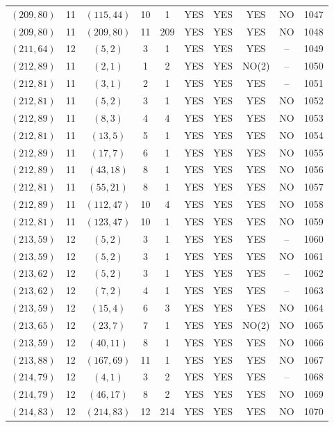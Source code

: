 \begin{longtable}{|c|c|c|c|c|c|c|c|c|c|}
$(209, 80)$ & 11 & $(115, 44)$ & 10 & 1 & YES & YES & YES & NO & 1047\\
$(209, 80)$ & 11 & $(209, 80)$ & 11 & 209 & YES & YES & YES & NO & 1048\\
$(211, 64)$ & 12 & $(5, 2)$ & 3 & 1 & YES & YES & YES & -- & 1049\\
$(212, 89)$ & 11 & $(2, 1)$ & 1 & 2 & YES & YES & NO(2) & -- & 1050\\
$(212, 81)$ & 11 & $(3, 1)$ & 2 & 1 & YES & YES & YES & -- & 1051\\
$(212, 81)$ & 11 & $(5, 2)$ & 3 & 1 & YES & YES & YES & NO & 1052\\
$(212, 89)$ & 11 & $(8, 3)$ & 4 & 4 & YES & YES & YES & NO & 1053\\
$(212, 81)$ & 11 & $(13, 5)$ & 5 & 1 & YES & YES & YES & NO & 1054\\
$(212, 89)$ & 11 & $(17, 7)$ & 6 & 1 & YES & YES & YES & NO & 1055\\
$(212, 89)$ & 11 & $(43, 18)$ & 8 & 1 & YES & YES & YES & NO & 1056\\
$(212, 81)$ & 11 & $(55, 21)$ & 8 & 1 & YES & YES & YES & NO & 1057\\
$(212, 89)$ & 11 & $(112, 47)$ & 10 & 4 & YES & YES & YES & NO & 1058\\
$(212, 81)$ & 11 & $(123, 47)$ & 10 & 1 & YES & YES & YES & NO & 1059\\
$(213, 59)$ & 12 & $(5, 2)$ & 3 & 1 & YES & YES & YES & -- & 1060\\
$(213, 59)$ & 12 & $(5, 2)$ & 3 & 1 & YES & YES & YES & NO & 1061\\
$(213, 62)$ & 12 & $(5, 2)$ & 3 & 1 & YES & YES & YES & -- & 1062\\
$(213, 62)$ & 12 & $(7, 2)$ & 4 & 1 & YES & YES & YES & -- & 1063\\
$(213, 59)$ & 12 & $(15, 4)$ & 6 & 3 & YES & YES & YES & NO & 1064\\
$(213, 65)$ & 12 & $(23, 7)$ & 7 & 1 & YES & YES & NO(2) & NO & 1065\\
$(213, 59)$ & 12 & $(40, 11)$ & 8 & 1 & YES & YES & YES & NO & 1066\\
$(213, 88)$ & 12 & $(167, 69)$ & 11 & 1 & YES & YES & YES & NO & 1067\\
$(214, 79)$ & 12 & $(4, 1)$ & 3 & 2 & YES & YES & YES & -- & 1068\\
$(214, 79)$ & 12 & $(46, 17)$ & 8 & 2 & YES & YES & YES & NO & 1069\\
$(214, 83)$ & 12 & $(214, 83)$ & 12 & 214 & YES & YES & YES & NO & 1070\\

\end{longtable}
